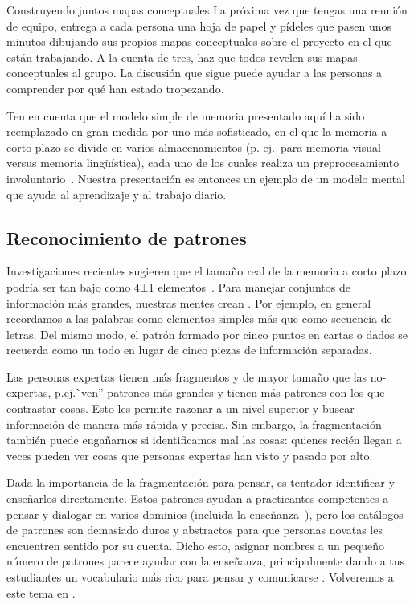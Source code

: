 
\begin{aside}{Construyendo juntos mapas conceptuales}
 La próxima vez que tengas una reunión de equipo,
 entrega a cada persona una hoja de papel
 y pídeles que pasen unos minutos dibujando sus propios mapas conceptuales sobre el proyecto en el que están trabajando.
  A la cuenta de tres,
  haz que todos revelen sus mapas conceptuales al grupo.
  La discusión que sigue puede ayudar a las personas a comprender
  por qué han estado tropezando.
\end{aside}

Ten en cuenta que el modelo simple de memoria presentado aquí ha sido reemplazado en gran medida por uno más sofisticado,
en el que la memoria a corto plazo se divide en varios almacenamientos
(p. ej.\ para memoria visual versus memoria lingüística),
cada uno de los cuales realiza un pre\-procesamiento involuntario~\cite{Mill2016a}.
Nuestra presentación es entonces un ejemplo de un modelo mental que ayuda al aprendizaje y al trabajo diario.

\subsection*{Reconocimiento de patrones}

Investigaciones recientes sugieren que el tamaño real de la memoria a corto plazo 
podría ser tan bajo como 4±1 elementos~\cite{Dida2016}.
Para manejar conjuntos de información más grandes,
nuestras mentes crean .
Por ejemplo,
en general recordamos a las palabras como elementos simples más que como secuencia de letras.
Del mismo modo,
el patrón formado por cinco puntos en cartas o dados se recuerda como un todo 
en lugar de cinco piezas de información separadas.

Las personas expertas tienen más fragmentos y de mayor tamaño que las no-expertas,
p.ej.\``ven'' patrones más grandes y tienen más patrones con los que contrastar cosas.
Esto les permite razonar a un nivel superior
y buscar información de manera más rápida y precisa.
Sin embargo,
la fragmentación también puede engañarnos si identificamos mal las cosas:
quienes recién llegan a veces pueden ver cosas que personas expertas han visto y pasado por alto.

Dada la importancia de la fragmentación para pensar,
es tentador identificar 
y enseñarlos directamente. 
Estos patrones ayudan a practicantes competentes a pensar y dialogar en varios dominios (incluida la enseñanza~\cite{Berg2012}),
pero los catálogos de patrones son demasiado duros y abstractos para que personas novatas les encuentren sentido por su cuenta.
Dicho esto,
asignar nombres a un pequeño número de patrones parece ayudar con la enseñanza,
principalmente dando a tus estudiantes un vocabulario más rico para pensar y comunicarse \cite{Kuit2004,Byck2005,Saja2006}.
Volveremos a este tema en .

